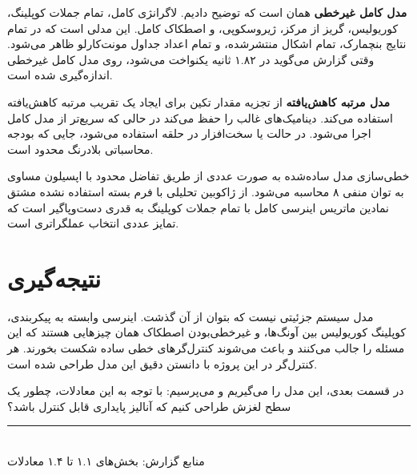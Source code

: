\documentclass[12pt, a4paper]{article}
\newcommand{\dash}{\lr{---}}
\begin{document}
\textbf{مدل کامل غيرخطی} همان است که توضيح داديم. لاگرانژی کامل، تمام جملات کوپلينگ، کوريولیس، گريز از مرکز، ژيروسکوپی، و اصطکاک کامل. اين مدلی است که در تمام نتايج بنچمارک، تمام اشکال منتشرشده، و تمام اعداد جداول مونت‌کارلو ظاهر می‌شود. وقتی گزارش می‌گويد  در ۱.۸۲ ثانيه يکنواخت می‌شود، روی مدل کامل غيرخطی اندازه‌گيری شده است.

\textbf{مدل مرتبه کاهش‌يافته} از تجزيه مقدار تکين برای ايجاد يک تقريب مرتبه کاهش‌يافته استفاده می‌کند. ديناميک‌های غالب را حفظ می‌کند در حالی که سريع‌تر از مدل کامل اجرا می‌شود. در حالت  يا سخت‌افزار در حلقه استفاده می‌شود، جايی که بودجه محاسباتی بلادرنگ محدود است.

خطی‌سازی مدل ساده‌شده به صورت عددی از طريق تفاضل محدود با اپسيلون مساوی  به توان منفی ۸ محاسبه می‌شود. از ژاکوبين تحليلی با فرم بسته استفاده نشده \dash{} مشتق نمادين ماتريس اينرسی کامل با تمام جملات کوپلينگ به قدری دست‌وپاگير است که تمايز عددی انتخاب عملگراتری است.

\section{نتيجه‌گيری}

مدل سيستم جزئيتی نيست که بتوان از آن گذشت. اينرسی وابسته به پيکربندی، کوپلينگ کوريولیس بين آونگ‌ها، و غيرخطی‌بودن اصطکاک همان چيزهايی هستند که اين مسئله را جالب می‌کنند و باعث می‌شوند کنترل‌گرهای خطی ساده شکست بخورند. هر کنترل‌گر در اين پروژه با دانستن دقيق اين مدل طراحی شده است.

در قسمت بعدی، اين مدل را می‌گيريم و می‌پرسيم: با توجه به اين معادلات، چطور يک سطح لغزش طراحی کنيم که آناليز پايداری قابل کنترل باشد؟

\vspace{1.5cm}
\begin{center}
{\color{seriesblue}\rule{0.45\linewidth}{0.4pt}}\\[8pt]
{\small\color{sectiongray}
منابع گزارش: بخش‌های ۱.۱ تا ۱.۴ \dash{} معادلات 
}
\end{center}
\end{document}
